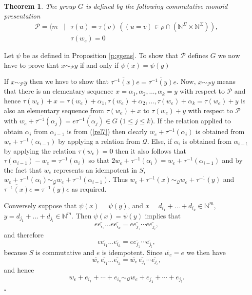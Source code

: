 \documentclass[12pt]{article}
\newtheorem{theorem}{\bf Theorem}
\newenvironment{proof}{{\it Proof.\/}}{$\square$\\}
\begin{document}
\begin{theorem} \label{T:maxgroup}
The group $G$ is defined by the following 
commutative monoid presentation
\begin{eqnarray}
\label{rel7}\mathcal{P}=\langle m&\mid&
\tau(u)=\tau(v)\ 
((u=v)\in \rho\cap(\mathbb{N}^{\Sigma}\!\times\mathbb{N}^{\Sigma})),\\
\label{rel8}&&\tau(w_e)=0 
\end{eqnarray}
\end{theorem}

\begin{proof}
Let $\psi$ be as defined in Proposition \ref{p:ggens}.
To show that $\mathcal{P}$ defines $G$ we now have to prove
that $x\sim_{\mathcal{P}}y$ if and only if $\psi(x)=\psi(y)$ 

If $x\sim_{\mathcal{P}}y$ then we have to show that
$\overline{\tau^{-1}(x)}e=\overline{\tau^{-1}(y)}e$.
Now, $x\sim_{\mathcal{P}}y$
means that there is an elementary sequence $x=\alpha_1,\alpha_2,
\ldots,\alpha_k=y$ with respect to $\mathcal{P}$ and hence
$\tau(w_e)+x=\tau(w_e)+\alpha_1,\tau(w_e)+\alpha_2,\ldots,
\tau(w_e)+\alpha_k=\tau(w_e)+y$ is also an elementary sequence from 
$\tau(w_e)+x$ to $\tau(w_e)+y$ with respect to $\mathcal{P}$ with 
$\overline{w_e+\tau^{-1}(\alpha_j)}=e\overline{\tau^{-1}(\alpha_j)}\in G$ 
($1\leq j\leq k$).
If the relation applied to obtain $\alpha_i$ from $\alpha_{i-1}$
is from (\ref{rel7}) then clearly $w_e+\tau^{-1}(\alpha_i)$ is obtained
from $w_e+\tau^{-1}(\alpha_{i-1})$ by applying a relation from $\mathcal{Q}$.
Else, if $\alpha_i$ is obtained from $\alpha_{i-1}$ by applying the
relation $\tau(w_e)=0$ then it also follows that
$\tau(\alpha_{i-1}) - w_e = \tau^{-1}(\alpha_i)$ so that
$2w_e+\tau^{-1}(\alpha_i) = w_e+\tau^{-1}(\alpha_{i-1})$ and by the fact that
$w_e$ represents an idempotent in $S$,
$w_e+\tau^{-1}(\alpha_i)
\sim_{\mathcal{Q}}w_e+\tau^{-1}(\alpha_{i-1})$. 
Thus $w_e+\tau^{-1}(x)\sim_{\mathcal{Q}}w_e+\tau^{-1}(y)$ and
$\overline{\tau^{-1}(x)}e=\overline{\tau^{-1}(y)}e$ as required. 

Conversely suppose that $\psi(x)=\psi(y)$, and 
$x=d_{i_1}+\ldots+d_{i_k}\in\mathbb{N}^m$,
$y=d_{j_1}+\ldots+d_{j_l}\in\mathbb{N}^m$.
Then $\psi(x)=\psi(y)$ implies that
$$e\overline{e_{i_1}}\ldots e\overline{e_{i_k}}=
e\overline{e_{j_1}}\cdots e\overline{e_{j_l}},$$
and therefore  
$$e\overline{e_{i_1}}\ldots\overline{e_{i_k}}=
e\overline{e_{j_1}}\cdots \overline{e_{j_l}},$$
because $S$ is commutative and $e$ is idempotent.
Since $\overline{w_e}=e$ we then have
$$\overline{w_e}\,\overline{e_{i_1}}\ldots\overline{e_{i_k}}=
\overline{w_e}\,\overline{e_{j_1}}\cdots \overline{e_{j_l}},$$
and hence 
$$w_e+e_{i_1}+\cdots+e_{i_k}\sim_{\mathcal{Q}} w_e+e_{j_1}+\cdots
+e_{j_l}.$$


\end{proof}
\end{document}
